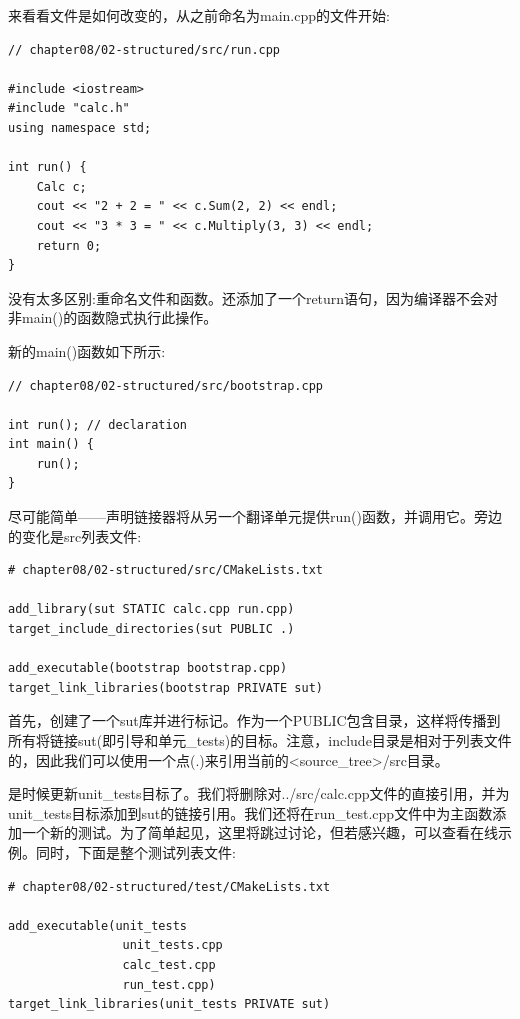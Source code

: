 来看看文件是如何改变的，从之前命名为main.cpp的文件开始:

\begin{lstlisting}[style=styleCXX]
// chapter08/02-structured/src/run.cpp

#include <iostream>
#include "calc.h"
using namespace std;

int run() {
	Calc c;
	cout << "2 + 2 = " << c.Sum(2, 2) << endl;
	cout << "3 * 3 = " << c.Multiply(3, 3) << endl;
	return 0;
}
\end{lstlisting} 

没有太多区别:重命名文件和函数。还添加了一个return语句，因为编译器不会对非main()的函数隐式执行此操作。

新的main()函数如下所示:

\begin{lstlisting}[style=styleCXX]
// chapter08/02-structured/src/bootstrap.cpp

int run(); // declaration
int main() {
	run();
}
\end{lstlisting} 

尽可能简单——声明链接器将从另一个翻译单元提供run()函数，并调用它。旁边的变化是src列表文件:

\begin{lstlisting}[style=styleCMake]
# chapter08/02-structured/src/CMakeLists.txt

add_library(sut STATIC calc.cpp run.cpp)
target_include_directories(sut PUBLIC .)

add_executable(bootstrap bootstrap.cpp)
target_link_libraries(bootstrap PRIVATE sut)
\end{lstlisting} 

首先，创建了一个sut库并进行标记。作为一个PUBLIC包含目录，这样将传播到所有将链接sut(即引导和单元\_tests)的目标。注意，include目录是相对于列表文件的，因此我们可以使用一个点(.)来引用当前的<source\_tree>/src目录。

是时候更新unit\_tests目标了。我们将删除对../src/calc.cpp文件的直接引用，并为unit\_tests目标添加到sut的链接引用。我们还将在run\_test.cpp文件中为主函数添加一个新的测试。为了简单起见，这里将跳过讨论，但若感兴趣，可以查看在线示例。同时，下面是整个测试列表文件:

\begin{lstlisting}[style=styleCMake]
# chapter08/02-structured/test/CMakeLists.txt

add_executable(unit_tests
				unit_tests.cpp
				calc_test.cpp
				run_test.cpp)
target_link_libraries(unit_tests PRIVATE sut)
\end{lstlisting} 

